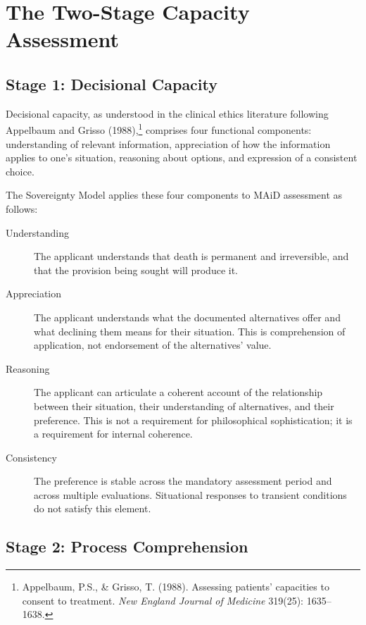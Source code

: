 \documentclass[11pt, letterpaper]{article}
\begin{document}
\section{The Two-Stage Capacity Assessment}

\subsection{Stage 1: Decisional Capacity}

Decisional capacity, as understood in the clinical ethics literature following
Appelbaum and Grisso (1988),\footnote{%
  Appelbaum, P.S., \& Grisso, T. (1988). Assessing patients' capacities to consent
  to treatment. \textit{New England Journal of Medicine} 319(25): 1635--1638.}
comprises four functional components: understanding of relevant information,
appreciation of how the information applies to one's situation, reasoning about
options, and expression of a consistent choice.

The Sovereignty Model applies these four components to MAiD assessment as follows:

\begin{description}
  \item[Understanding] The applicant understands that death is permanent and
    irreversible, and that the provision being sought will produce it.
  \item[Appreciation] The applicant understands what the documented alternatives offer
    and what declining them means for their situation. This is comprehension of
    application, not endorsement of the alternatives' value.
  \item[Reasoning] The applicant can articulate a coherent account of the relationship
    between their situation, their understanding of alternatives, and their preference.
    This is not a requirement for philosophical sophistication; it is a requirement
    for internal coherence.
  \item[Consistency] The preference is stable across the mandatory assessment period
    and across multiple evaluations. Situational responses to transient conditions
    do not satisfy this element.
\end{description}

\subsection{Stage 2: Process Comprehension}
\end{document}
